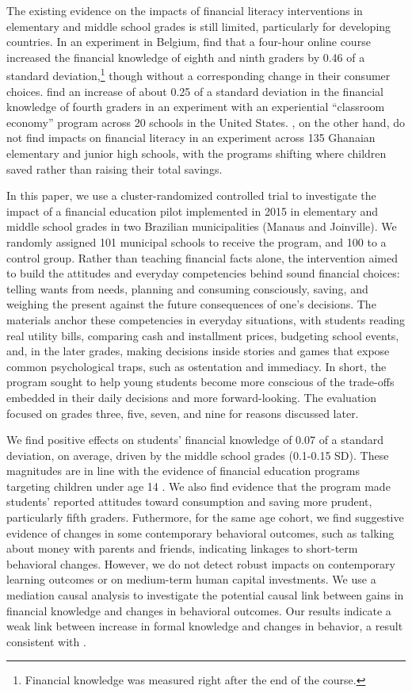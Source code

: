 The existing evidence on the impacts of financial literacy interventions in elementary and middle school grades is still limited, particularly for developing countries.
In an experiment in Belgium, \cite{de2021effect} find that a four-hour online course increased the financial knowledge of eighth and ninth graders by 0.46 of a standard deviation,\footnote{Financial knowledge was measured right after the end of the course.} though without a corresponding change in their consumer choices. \cite{batty2020experiential} find an increase of about 0.25 of a standard deviation in the financial knowledge of fourth graders in an experiment with an experiential ``classroom economy'' program across 20 schools in the United States. \cite{berry2018impact}, on the other hand, do not find impacts on financial literacy in an experiment across 135 Ghanaian elementary and junior high schools, with the programs shifting where children saved rather than raising their total savings. 

In this paper, we use a cluster-randomized controlled trial to investigate the impact of a financial education pilot implemented in 2015 in elementary and middle school grades in two Brazilian municipalities (Manaus and Joinville). We randomly assigned 101 municipal schools to receive the program, and 100 to a control group. Rather than teaching financial facts alone, the intervention aimed to build the attitudes and everyday competencies behind sound financial choices: telling wants from needs, planning and consuming consciously, saving, and weighing the present against the future consequences of one's decisions. The materials anchor these competencies in everyday situations, with students reading real utility bills, comparing cash and installment prices, budgeting school events, and, in the later grades, making decisions inside stories and games that expose common psychological traps, such as ostentation and immediacy. In short, the program sought to help young students become more conscious of the trade-offs embedded in their daily decisions and more forward-looking. The evaluation focused on grades three, five, seven, and nine for reasons discussed later.

We find positive effects on students' financial knowledge of 0.07 of a standard deviation, on average, driven by the middle school grades (0.1-0.15 SD). These magnitudes are in line with the evidence of financial education programs targeting children under age 14 \citep{kaiser2022financial}. We also find evidence that the program made students' reported attitudes toward consumption and saving more prudent, particularly fifth graders. Futhermore, for the same age cohort, we find suggestive evidence of changes in some contemporary behavioral outcomes, such as talking about money with parents and friends, indicating linkages to short-term behavioral changes. However, we do not detect robust impacts on contemporary learning outcomes or on medium-term human capital investments. We use a mediation causal analysis to investigate the potential causal link between gains in financial knowledge and changes in behavioral outcomes. Our results indicate a weak link between increase in formal knowledge and changes in behavior, a result consistent with \cite{de2021effect}.

